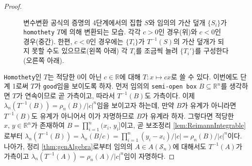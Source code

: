 \begin{proof}
\begin{figure}[ht!]
        \caption{변수변환 공식의 증명의 4단계에서의 집합 $S$와 임의의 가산 덮개 $\{S_i\}$가 \texttt{homothety} $T$에 의해 변환되는 모습. 각각 $c>0$인 경우(위)와 $c<0$인 경우(중간). 한편, $c<0$인 경우에는 $\{T_i\}$가 $T^{-1}(S)$의 가산 덮개가 되지 못할 수도 있으므로(왼쪽 아래) 각 $T_i$를 조금씩 늘려 $\{T_i'\}$를 구성한다(오른쪽 아래).}
    \end{figure}

    \texttt{Homothety}인 $T$는 적당한 0이 아닌 $c\in\mathbb{R}$에 대해 $T:x\mapsto cx$로 쓸 수 있다. 이번에도 단계 1로써 $T$가 \texttt{good}임을 보이도록 하자. 먼저 임의의 \texttt{semi-open box} $B\subseteq\mathbb{R}^n$를 생각하면 $T$가 연속이므로 곧 가측이고, 따라서 $T^{-1}(B)$도 가측이다. 이제 $\lambda_n(T^{-1}(B))=\rho_n(B)/|c|^n$임을 보이고자 하는데, 만약 $B$가 유계가 아니라면 $T^{-1}(B)$도 유계가 아니어서 이가 자명하므로 $B$가 유계라 하자. 그렇다면 적당한 $x,\,y\in\mathbb{R}^n$가 존재하여 $B=\prod_{i=1}^n(x_i,\,y_i]$이고, 곧 보조정리 \ref{lem:ReimannIntegrable}로부터 $\lambda_n(T^{-1}(B))=\lambda_n(B/c)=\prod_{i=1}^n(y_i-x_i)/|c|=\rho_n(B)/|c|^n$이다.\footnotemark\label{note:rotateSemiOpenBox} 나아가, 정리 \ref{thm:genAlgebra}로부터 임의의 $A\in A(\mathcal{S}_n)$에 대해서도 $T^{-1}(A)$가 가측이고 $\lambda_n(T^{-1}(A))=\rho_n(A)/|c|^n$임이 자명하다.
    

\end{proof}
